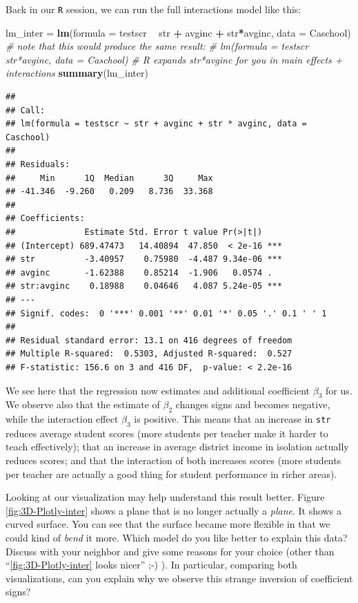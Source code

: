 \documentclass[]{book}
\newenvironment{Shaded}{\begin{snugshade}}{\end{snugshade}}
\newcommand{\KeywordTok}[1]{\textcolor[rgb]{0.13,0.29,0.53}{\textbf{#1}}}
\newcommand{\DataTypeTok}[1]{\textcolor[rgb]{0.13,0.29,0.53}{#1}}
\newcommand{\StringTok}[1]{\textcolor[rgb]{0.31,0.60,0.02}{#1}}
\newcommand{\CommentTok}[1]{\textcolor[rgb]{0.56,0.35,0.01}{\textit{#1}}}
\newcommand{\OperatorTok}[1]{\textcolor[rgb]{0.81,0.36,0.00}{\textbf{#1}}}
\newcommand{\NormalTok}[1]{#1}
\theoremstyle{definition}
\theoremstyle{definition}
\theoremstyle{definition}
\theoremstyle{remark}
\begin{document}
Back in our \texttt{R} session, we can run the full interactions model
like this:

\begin{Shaded}
\begin{Highlighting}[]
\NormalTok{lm_inter =}\StringTok{ }\KeywordTok{lm}\NormalTok{(}\DataTypeTok{formula =}\NormalTok{ testscr }\OperatorTok{~}\StringTok{ }\NormalTok{str }\OperatorTok{+}\StringTok{ }\NormalTok{avginc }\OperatorTok{+}\StringTok{ }\NormalTok{str}\OperatorTok{*}\NormalTok{avginc, }\DataTypeTok{data =}\NormalTok{ Caschool)}
\CommentTok{# note that this would produce the same result:}
\CommentTok{# lm(formula = testscr ~ str*avginc, data = Caschool)}
\CommentTok{# R expands str*avginc for you in main effects + interactions}
\KeywordTok{summary}\NormalTok{(lm_inter)}
\end{Highlighting}
\end{Shaded}

\begin{verbatim}
## 
## Call:
## lm(formula = testscr ~ str + avginc + str * avginc, data = Caschool)
## 
## Residuals:
##     Min      1Q  Median      3Q     Max 
## -41.346  -9.260   0.209   8.736  33.368 
## 
## Coefficients:
##              Estimate Std. Error t value Pr(>|t|)    
## (Intercept) 689.47473   14.40894  47.850  < 2e-16 ***
## str          -3.40957    0.75980  -4.487 9.34e-06 ***
## avginc       -1.62388    0.85214  -1.906   0.0574 .  
## str:avginc    0.18988    0.04646   4.087 5.24e-05 ***
## ---
## Signif. codes:  0 '***' 0.001 '**' 0.01 '*' 0.05 '.' 0.1 ' ' 1
## 
## Residual standard error: 13.1 on 416 degrees of freedom
## Multiple R-squared:  0.5303, Adjusted R-squared:  0.527 
## F-statistic: 156.6 on 3 and 416 DF,  p-value: < 2.2e-16
\end{verbatim}

We see here that the regression now estimates and additional coefficient
\(\beta_3\) for us. We observe also that the estimate of \(\beta_2\)
changes signs and becomes negative, while the interaction effect
\(\beta_3\) is positive. This means that an increase in \texttt{str}
reduces average student scores (more students per teacher make it harder
to teach effectively); that an increase in average district income in
isolation actually reduces scores; and that the interaction of both
increases scores (more students per teacher are actually a good thing
for student performance in richer areas).

Looking at our visualization may help understand this result better.
Figure \ref{fig:3D-Plotly-inter} shows a plane that is no longer
actually a \emph{plane}. It shows a curved surface. You can see that the
surface became more flexible in that we could kind of \emph{bend} it
more. Which model do you like better to explain this data? Discuss with
your neighbor and give some reasons for your choice (other than
``\ref{fig:3D-Plotly-inter} looks nicer'' ;-) ). In particular,
comparing both visualizations, can you explain why we observe this
strange inversion of coefficient signs?
\end{document}
